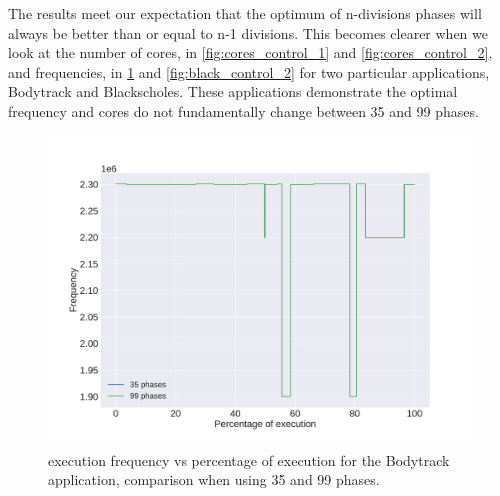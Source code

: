 The results meet our expectation that the optimum of n-divisions phases will always be better than or equal to n-1 divisions. This becomes clearer when we look at the number of cores, in \cref{fig:cores_control_1} and \cref{fig:cores_control_2}, and frequencies, in  \cref{fig:black_control_1} and \cref{fig:black_control_2} for two particular applications, Bodytrack and Blackscholes. These applications demonstrate the optimal frequency and cores do not fundamentally change between 35 and 99 phases.

\begin{figure}[h]
	\centering
	\includegraphics[width=\columnwidth]{phases/figures/signals/completo_bodytrack_1_freq_signals_cmp.pdf}
	\caption{execution frequency vs percentage of execution for the Bodytrack application, comparison when using 35 and 99 phases.}
	\label{fig:black_control_1}
\end{figure}%

